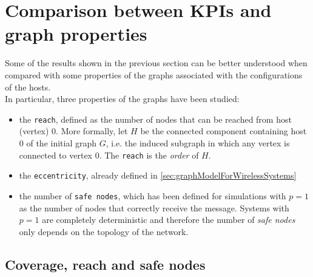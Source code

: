 \section{Comparison between KPIs and graph properties}

Some of the results shown in the previous section can be better understood when compared with some properties of the graphs associated with the configurations of the hosts.\\
In particular, three properties of the graphs have been studied:

\begin{itemize}
	\item the \texttt{reach}, defined as the number of nodes that can be reached from host (vertex) 0. More formally, let $H$ be the connected component containing host 0 of the initial graph $G$, i.e. the induced subgraph in which any vertex is connected to vertex 0. The \texttt{reach} is the \textit{order} of $H$.
	\item the \texttt{eccentricity}, already defined in \ref{sec:graphModelForWirelessSystems}
	\item the number of \texttt{safe nodes}, which has been defined for simulations with $p=1$ as the number of nodes that correctly receive the message. Systems with $p=1$ are completely deterministic and therefore the number of \textit{safe nodes} only depends on the topology of the network.
\end{itemize}

\subsection{Coverage, reach and safe nodes}\label{ssec:coverageReachSafenodes}

